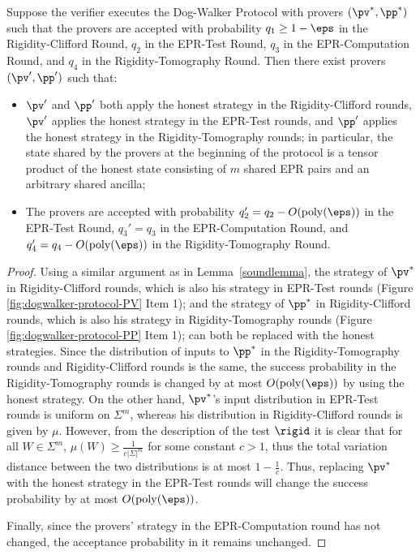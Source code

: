 \begin{lemma}\label{lem:PV-2-PP-4}
Suppose the verifier executes the Dog-Walker Protocol 
with provers $(\pv^*,\pp^*)$ such that the provers are accepted with probability $q_1\geq 1-\eps$ in the Rigidity-Clifford Round, $q_2$ in the EPR-Test Round, $q_3$ in the EPR-Computation Round, and $q_4$ in the Rigidity-Tomography Round. Then there exist provers $(\pv',\pp')$ such that:
\begin{itemize}[nolistsep]
\item $\pv'$ and $\pp'$ both apply the honest strategy in the Rigidity-Clifford rounds, $\pv'$ applies the honest strategy in the EPR-Test rounds, and $\pp'$ applies the honest strategy in the Rigidity-Tomography rounds; in particular, the state shared by the provers at the beginning of the protocol is a tensor product of the honest state consisting of $m$ shared EPR pairs and an arbitrary shared ancilla;
\item The provers are accepted with probability $q_2'=q_2-O(\mathrm{poly}(\eps))$ in the EPR-Test Round, $q_3'=q_3$ in the EPR-Computation Round, and $q_4'=q_4-O(\mathrm{poly}(\eps))$ in the Rigidity-Tomography Round. 
\end{itemize}
\end{lemma}

\begin{proof}
Using a similar argument as in Lemma~\ref{soundlemma}, the strategy of $\pv^*$ in
Rigidity-Clifford rounds, which is also his strategy in EPR-Test rounds (Figure \ref{fig:dogwalker-protocol-PV} Item 1); and the strategy of $\pp^*$ in Rigidity-Clifford rounds, which is also his strategy in Rigidity-Tomography rounds (Figure \ref{fig:dogwalker-protocol-PP} Item 1);
 can both be replaced with the honest strategies. Since the distribution of inputs to $\pp^*$ in the Rigidity-Tomography rounds and Rigidity-Clifford rounds is the same, the success probability in the Rigidity-Tomography rounds is changed by at most $O(\mathrm{poly}(\eps))$ by using the honest strategy. 
On the other hand, $\pv^*$'s input distribution in EPR-Test rounds is uniform on $\Sigma^m$, whereas his distribution in Rigidity-Clifford rounds is given by $\mu$. However, from the description of the test $\rigid$ it is clear that for all $W\in\Sigma^m$, $\mu(W)\geq \frac{1}{c|\Sigma|^m}$ for some constant $c>1$, thus the total variation distance between the two distributions is at most $1-\frac{1}{c}$. Thus, replacing $\pv^*$ with the honest strategy in the EPR-Test  rounds will change the success probability by at most  $O(\mathrm{poly}(\eps))$. 

Finally, since the provers' strategy in the EPR-Computation round has not changed, the
  acceptance probability in it remains unchanged.
\end{proof}

